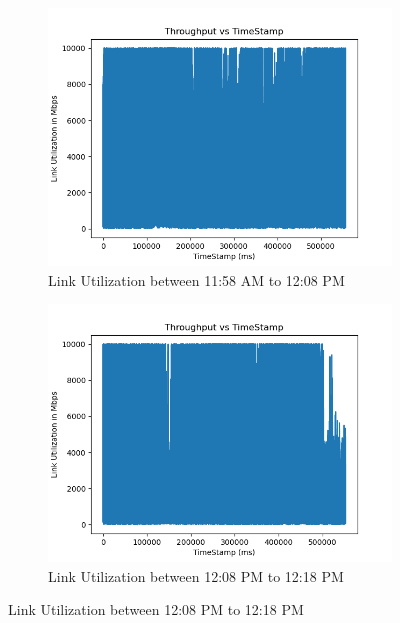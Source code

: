\begin{figure}[t]
     \centering
     \begin{subfigure}[h]{0.49\textwidth}
         \centering
         \includegraphics[width=\textwidth]{Figures/saturation_link_1.png}
         \caption[Link Utilization between 11:58 AM to 12:08 PM ]{Link Utilization between 11:58 AM to 12:08 PM}
         \label{fig:linkutil1}
     \end{subfigure}
     \begin{subfigure}[h]{0.49\textwidth}
         \centering
         \includegraphics[width=\textwidth]{Figures/saturation_link_2.png}
         \caption[Link Utilization between 12:08 PM to 12:18 PM ]{Link Utilization between 12:08 PM to 12:18 PM }

\end{subfigure}
\end{figure}
